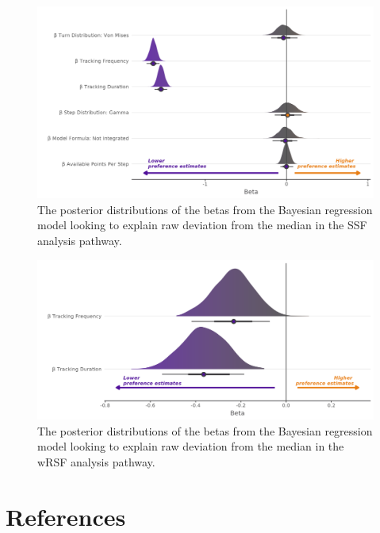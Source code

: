 \documentclass[10pt,a4paper]{article}
\begin{document}
\begin{figure}
\includegraphics[width=1\linewidth]{../figures/ssf_rEstSSF_effectsPlot} \caption{The posterior distributions of the betas from the Bayesian regression model looking to explain raw deviation from the median in the SSF analysis pathway.}\label{fig:rEstBetasSSF}
\end{figure}

\begin{figure}
\includegraphics[width=1\linewidth]{../figures/wrsf_rEstwrsf_effectsPlot} \caption{The posterior distributions of the betas from the Bayesian regression model looking to explain raw deviation from the median in the wRSF analysis pathway.}\label{fig:rEstBetasWRSF}
\end{figure}

\hypertarget{references}{%
\section*{References}\label{references}}
\end{document}
